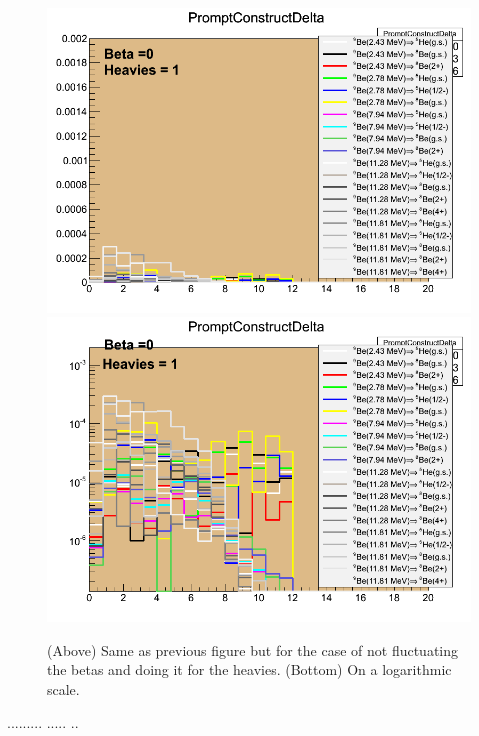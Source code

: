 \documentclass{JINST}
\begin{document}
  
    \begin{figure}[htp]
 \begin{center}
  \includegraphics[scale=0.45]{canvas_0_1.png}
   \includegraphics[scale=0.45]{log_canvas.png}
   \label{BRUncert_2}
    \end{center}
    \caption{ (Above) Same as previous figure but for the case of not fluctuating the betas and doing it for the heavies. (Bottom) On a logarithmic
    scale.}
    \end{figure}
      
      
      .........
      .....
      ..

       
       
\end{document}
